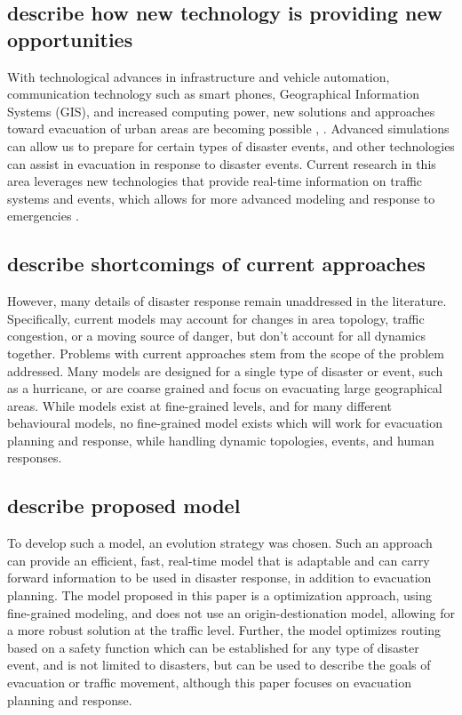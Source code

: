 \documentclass{sig-alternate-05-2015}
\begin{document}
	\subsection{describe how new technology is providing new opportunities}
	With technological advances in infrastructure and vehicle automation, communication technology such as smart phones, Geographical Information Systems (GIS), and increased computing power, new solutions and approaches toward evacuation of urban areas are becoming possible \cite{yin2004using}, \cite{yu2002highway}. Advanced simulations can allow us to prepare for certain types of disaster events, and other technologies can assist in evacuation in response to disaster events. Current research in this area leverages new technologies that provide real-time information on traffic systems and events, which allows for more advanced modeling and response to emergencies \cite{hamza2008leveraging}.
	
	\subsection{describe shortcomings of current approaches}
	However, many details of disaster response remain unaddressed in the literature. Specifically, current models may account for changes in area topology, traffic congestion, or a moving source of danger, but don't account for all dynamics together. Problems with current approaches stem from the scope of the problem addressed. Many models are designed for a single type of disaster or event, such as a hurricane, or are coarse grained and focus on evacuating large geographical areas. While models exist at fine-grained levels, and for many different behavioural models, no fine-grained model exists which will work for evacuation planning and response, while handling dynamic topologies, events, and human responses. 
	
	\subsection{describe proposed model}
	To develop such a model, an evolution strategy was chosen. Such an approach can provide an efficient, fast, real-time model that is adaptable and can carry forward information to be used in disaster response, in addition to evacuation planning. The model proposed in this paper is a optimization approach, using fine-grained modeling, and does not use an origin-destionation model, allowing for a more robust solution at the traffic level. Further, the model optimizes routing based on a safety function which can be established for any type of disaster event, and is not limited to disasters, but can be used to describe the goals of evacuation or traffic movement, although this paper focuses on evacuation planning and response. 
	
\end{document}

